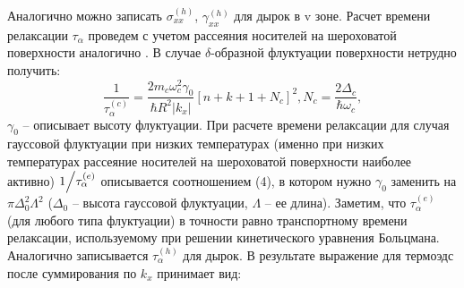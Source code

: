 Аналогично можно записать $\sigma _{xx}^{(h)} $, $\gamma _{xx}^{(h)} $ для дырок в v зоне. Расчет времени релаксации $\tau _{\alpha } $ проведем с учетом рассеяния носителей на шероховатой поверхности аналогично \cite{Karapetyan2011}. В случае $\delta $-образной флуктуации поверхности нетрудно получить:
\begin{equation} \label{eq:44_40}
\frac{1}{\tau _{\alpha }^{(c)} } =\frac{2m_{c} \omega _{c}^{2} \gamma _{0} }{\hbar R^{2} \left|k_{x} \right|} \left[n+k+1+N_{c} \right]^{2} , N_{c} =\frac{2\Delta _{c} }{\hbar \omega _{c} } ,
\end{equation} 
$\gamma _{0} $ -- описывает высоту флуктуации. При расчете времени релаксации для случая гауссовой флуктуации \cite{Vurgaftman1999} при низких температурах (именно при низких температурах рассеяние носителей на шероховатой поверхности наиболее активно) ${1 \mathord{\left/{\vphantom{1 \tau _{\alpha }^{(e)} }}\right.\kern-\nulldelimiterspace} \tau _{\alpha }^{(e)} } $ описывается соотношением (4), в котором нужно $\gamma _{0} $ заменить на $\pi \Delta _{0}^{2} \Lambda ^{2} $ ($\Delta _{0} $ -- высота гауссовой флуктуации, $\Lambda $ -- ее длина). Заметим, что $\tau _{\alpha }^{(e)} $ (для любого типа флуктуации) в точности равно транспортному времени релаксации, используемому при решении кинетического уравнения Больцмана. Аналогично записывается $\tau _{\alpha }^{(h)} $ для дырок. В результате выражение для термоэдс после суммирования по $k_{x} $ принимает вид:
 
